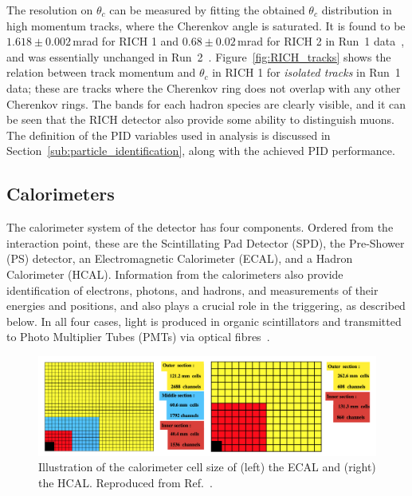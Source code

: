 The resolution on $\theta_c$ can be measured by fitting the obtained $\theta_c$ distribution in high momentum tracks, where the Cherenkov angle is saturated. It is found to be $1.618 \pm 0.002$\,mrad for RICH 1 and $0.68 \pm 0.02$\,mrad for RICH 2 in Run~1 data~\cite{RICH-Performance}, and was essentially unchanged in Run~2~\cite{RICH-Performance-2}. Figure~\ref{fig:RICH_tracks} shows the relation between track momentum and $\theta_c$ in RICH 1 for \emph{isolated tracks} in Run~1 data; these are tracks where the Cherenkov ring does not overlap with any other Cherenkov rings. The bands for each hadron species are clearly visible, and it can be seen that the RICH detector also provide some ability to distinguish muons. The definition of the PID variables used in analysis is discussed in Section~\ref{sub:particle_identification}, along with the achieved PID performance.

\subsection{Calorimeters} %
\label{sub:calorimeters}

The calorimeter system of the \lhcb detector has four components. Ordered from the interaction point, these are the Scintillating Pad Detector (SPD), the Pre-Shower (PS) detector, an Electromagnetic Calorimeter (ECAL), and a Hadron Calorimeter (HCAL). Information from the calorimeters also provide identification of electrons, photons, and hadrons, and measurements of their energies and positions, and also plays a crucial role in the triggering, as described below. In all four cases, light is produced in organic scintillators and transmitted to Photo Multiplier Tubes (PMTs) via optical fibres~\cite{LHCb-detector}.

\begin{figure}[tb]
    \centering
    \includegraphics[width=0.9\columnwidth]{figures/detector/cell_modules.png}
    \caption{Illustration of the calorimeter cell size of (left) the ECAL and (right) the HCAL. Reproduced from Ref.~\cite{CAL-TDR}.}
    \label{fig:cal_cells}
\end{figure}

